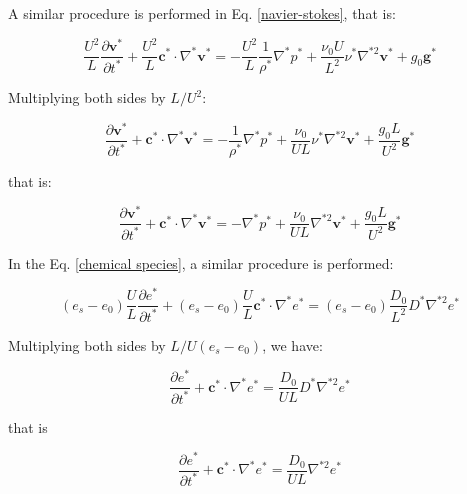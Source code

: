 \medskip
\noindent
A similar procedure is performed in
Eq. \ref{navier-stokes}, that is:

\begin{equation}
 \frac{U^{2}}{L} \frac{\partial \textbf{v$^{*}$}}{\partial t^{*}} 
 + 
 \frac{U^{2}}{L} \textbf{c$^{*}$} \cdot \nabla^{*} \textbf{v$^{*}$}
 =
 -
 \frac{U^{2}}{L} \frac{1}{\rho^{*}} \nabla^{*} p^{*}
 +
 \frac{\nu_{0} U}{L^{2}} \nu^{*} \nabla^{*2} \textbf{v$^{*}$}
 +
 g_{0} \textbf{g$^{*}$}
\end{equation}

\medskip
\noindent
Multiplying both sides by $L/U^{2}$:

\begin{equation} \label{navier-stokes adimensional 2}
 \frac{\partial \textbf{v$^{*}$}}{\partial t^{*}} 
 + 
 \textbf{c$^{*}$} \cdot \nabla^{*} \textbf{v$^{*}$}
 =
 -
 \frac{1}{\rho^{*}} \nabla^{*} p^{*}
 +
 \frac{\nu_{0}}{UL} \nu^{*} \nabla^{*2} \textbf{v$^{*}$}
 +
 \frac{g_{0}L}{U^{2}} \textbf{g$^{*}$}
\end{equation}

\medskip
\noindent
that is:

\begin{equation} \label{navier-stokes adimensional 1}
 \frac{\partial \textbf{v$^{*}$}}{\partial t^{*}} 
 + 
 \textbf{c$^{*}$} \cdot \nabla^{*} \textbf{v$^{*}$}
 =
 -
 \nabla^{*} p^{*}
 +
 \frac{\nu_{0}}{UL} \nabla^{*2} \textbf{v$^{*}$}
 +
 \frac{g_{0}L}{U^{2}} \textbf{g$^{*}$}
\end{equation}

\medskip
\noindent
In the Eq. \ref{chemical species}, a similar procedure is performed:

\begin{equation}
 (e_{s}-e_{0}) \frac{U}{L} \frac{\partial e^{*}}{\partial t^{*}}
 +
 (e_{s}-e_{0}) \frac{U}{L} \textbf{c$^{*}$} \cdot \nabla^{*} e^{*}
 =
 (e_{s}-e_{0}) \frac{D_{0}}{L^{2}} D^{*} \nabla^{*2} e^{*}
\end{equation}

\medskip
\noindent
Multiplying both sides by $L/U(e_{s}-e_{0})$, we have:

\begin{equation} \label{especie quimica adimensional 2}
 \frac{\partial e^{*}}{\partial t^{*}}
 +
 \textbf{c$^{*}$} \cdot \nabla^{*} e^{*}
 =
 \frac{D_{0}}{UL} D^{*} \nabla^{*2} e^{*}
\end{equation}

\medskip
\noindent
that is

\begin{equation} \label{especie quimica adimensional 1}
 \frac{\partial e^{*}}{\partial t^{*}}
 +
 \textbf{c$^{*}$} \cdot \nabla^{*} e^{*}
 =
 \frac{D_{0}}{UL} \nabla^{*2} e^{*}
\end{equation}

